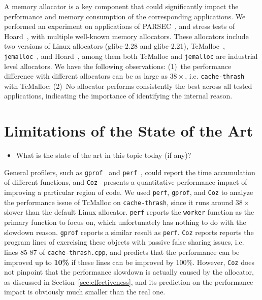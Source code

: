 \documentclass[pageno]{jpaper}
\begin{document}
\noindent
A memory allocator is a key component that could significantly impact the performance and memory consumption of the corresponding applications. We performed an experiment on applications of PARSEC~\cite{parsec}, and stress tests of Hoard~\cite{Hoard}, with multiple well-known memory allocators. These allocators include two versions of Linux allocators (glibc-2.28 and glibc-2.21), TcMalloc~\cite{tcmalloc}, \texttt{jemalloc}~\cite{jemalloc}, and Hoard~\cite{Hoard}, among them both TcMalloc and \texttt{jemalloc} are industrial level allocators. We have the following observations: (1)~the performance difference with different allocators can be as large as $38\times$, i.e. \texttt{cache-thrash} with TcMalloc; (2)~No allocator performs consistently the best across all tested applications, indicating the importance of identifying the internal reason.

\section{Limitations of the State of the Art}
\label{sec:limitations}

\begin{itemize}
\item What is the state of the art in this topic today (if any)?
\end{itemize}

\noindent
General profilers, such as \texttt{gprof}~\cite{DBLP:conf/sigplan/GrahamKM82} and \texttt{perf}~\cite{perf}, could report the time accumulation of different functions, and \texttt{Coz}~\cite{Coz} presents a quantitative performance impact of improving a particular region of code. We used \texttt{perf}, \texttt{gprof}, and \texttt{Coz} to analyze the performance issue of TcMalloc on \texttt{cache-thrash}, since it runs around $38\times$ slower than the default Linux allocator. \texttt{perf} reports the \texttt{worker} function as the primary function to focus on, which unfortunately has nothing to do with the slowdown reason. \texttt{gprof} reports a similar result as \texttt{perf}. \texttt{Coz} reports reports the program lines of exercising these objects with passive false sharing issues, i.e. lines 85-87 of \texttt{cache-thrash.cpp}, and predicts that the performance can be improved up to \textbf{10\%} if these lines can be improved by 100\%. However, \texttt{Coz} does not pinpoint that the performance slowdown is actually caused by the allocator, as discussed in Section~\ref{sec:effectiveness}, and its prediction on the performance impact is obviously much smaller than the real one.
\end{document}
